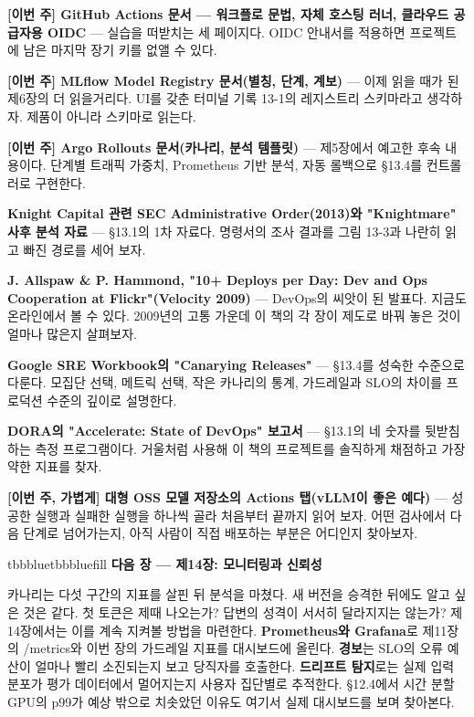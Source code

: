 \begin{tbbitemize}
  \item \textbf{[이번 주] GitHub Actions 문서 — 워크플로 문법, 자체 호스팅 러너, 클라우드 공급자용 OIDC} — 실습을 떠받치는 세 페이지다. OIDC 안내서를 적용하면 프로젝트에 남은 마지막 장기 키를 없앨 수 있다.
  \item \textbf{[이번 주] MLflow Model Registry 문서(별칭, 단계, 계보)} — 이제 읽을 때가 된 제6장의 더 읽을거리다. UI를 갖춘 터미널 기록 13-1의 레지스트리 스키마라고 생각하자. 제품이 아니라 스키마로 읽는다.
  \item \textbf{[이번 주] Argo Rollouts 문서(카나리, 분석 템플릿)} — 제5장에서 예고한 후속 내용이다. 단계별 트래픽 가중치, Prometheus 기반 분석, 자동 롤백으로 §13.4를 컨트롤러로 구현한다.
  \item \textbf{Knight Capital 관련 SEC Administrative Order(2013)와 "Knightmare" 사후 분석 자료} — §13.1의 1차 자료다. 명령서의 조사 결과를 그림 13-3과 나란히 읽고 빠진 경로를 세어 보자.
  \item \textbf{J. Allspaw \& P. Hammond, "10+ Deploys per Day: Dev and Ops Cooperation at Flickr"(Velocity 2009)} — DevOps의 씨앗이 된 발표다. 지금도 온라인에서 볼 수 있다. 2009년의 고통 가운데 이 책의 각 장이 제도로 바꿔 놓은 것이 얼마나 많은지 살펴보자.
  \item \textbf{Google SRE Workbook의 "Canarying Releases"} — §13.4를 성숙한 수준으로 다룬다. 모집단 선택, 메트릭 선택, 작은 카나리의 통계, 가드레일과 SLO의 차이를 프로덕션 수준의 깊이로 설명한다.
  \item \textbf{DORA의 "Accelerate: State of DevOps" 보고서} — §13.1의 네 숫자를 뒷받침하는 측정 프로그램이다. 거울처럼 사용해 이 책의 프로젝트를 솔직하게 채점하고 가장 약한 지표를 찾자.
  \item \textbf{[이번 주, 가볍게] 대형 OSS 모델 저장소의 Actions 탭(vLLM이 좋은 예다)} — 성공한 실행과 실패한 실행을 하나씩 골라 처음부터 끝까지 읽어 보자. 어떤 검사에서 다음 단계로 넘어가는지, 아직 사람이 직접 배포하는 부분은 어디인지 찾아보자.
\end{tbbitemize}

\vspace{5.0pt}

\begin{calloutbox}{tbbblue}{tbbbluefill}
{\normalsize\bfseries\color{tbbblue}다음 장 — 제14장: 모니터링과 신뢰성}\par\vspace{3pt}
카나리는 다섯 구간의 지표를 살핀 뒤 분석을 마쳤다. 새 버전을 승격한 뒤에도 알고 싶은 것은 같다. 첫 토큰은 제때 나오는가? 답변의 성격이 서서히 달라지지는 않는가? 제14장에서는 이를 계속 지켜볼 방법을 마련한다. \textbf{Prometheus와 Grafana}로 제11장의 /metrics와 이번 장의 가드레일 지표를 대시보드에 올린다. \textbf{경보}는 SLO의 오류 예산이 얼마나 빨리 소진되는지 보고 당직자를 호출한다. \textbf{드리프트 탐지}로는 실제 입력 분포가 평가 데이터에서 멀어지는지 사용자 집단별로 추적한다. §12.4에서 시간 분할 GPU의 p99가 예상 밖으로 치솟았던 이유도 여기서 실제 대시보드를 보며 찾아본다.
\end{calloutbox}
